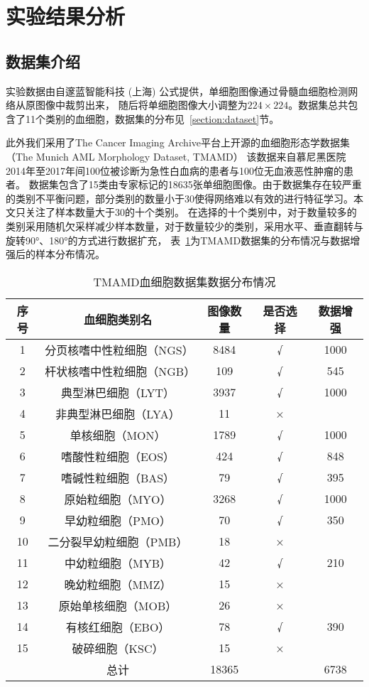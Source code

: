 \section{实验结果分析}
\subsection{数据集介绍}
实验数据由自邃蓝智能科技 (上海) 公式提供，单细胞图像通过骨髓血细胞检测网络从原图像中裁剪出来，
随后将单细胞图像大小调整为$224 \times 224$。数据集总共包含了11个类别的血细胞，数据集的分布见~\ref{section:dataset}节。

此外我们采用了The Cancer Imaging Archive平台上开源的血细胞形态学数据集（The Munich AML Morphology Dataset, TMAMD）
该数据来自慕尼黑医院2014年至2017年间100位被诊断为急性白血病的患者与100位无血液恶性肿瘤的患者。
数据集包含了15类由专家标记的18635张单细胞图像。由于数据集存在较严重的类别不平衡问题，部分类别的数量小于30使得网络难以有效的进行特征学习。本文只关注了样本数量大于30的十个类别。
在选择的十个类别中，对于数量较多的类别采用随机欠采样减少样本数量，对于数量较少的类别，采用水平、垂直翻转与旋转90°、180°的方式进行数据扩充，
表~\ref{table:tmamd_dataset}为TMAMD数据集的分布情况与数据增强\cite{van2001art}后的样本分布情况。

\begin{table}
  \caption{TMAMD血细胞数据集数据分布情况}   
  \centering 
  \label{table:tmamd_dataset}
  \begin{tabular}{ccccc}
    \toprule[2pt]
    序号 & 血细胞类别名  &  图像数量 & 是否选择 & 数据增强 \\
    \midrule[1.5pt] 
        1 & 分页核嗜中性粒细胞（NGS） & 8484 & √ & 1000  \\ 
        2 & 杆状核嗜中性粒细胞（NGB）  & 109 & √ & 545  \\ 
        3 & 典型淋巴细胞（LYT） & 3937 & √ & 1000  \\ 
        4 & 非典型淋巴细胞（LYA） & 11 & × &   \\ 
        5 & 单核细胞（MON） & 1789 & √ & 1000  \\ 
        6 & 嗜酸性粒细胞（EOS）  & 424 & √ & 848  \\ 
        7 & 嗜碱性粒细胞（BAS） & 79 & √ & 395  \\ 
        8 & 原始粒细胞（MYO） & 3268 & √ & 1000  \\ 
        9 & 早幼粒细胞（PMO） & 70 & √ & 350  \\ 
        10 & 二分裂早幼粒细胞（PMB） & 18 & × &   \\ 
        11 & 中幼粒细胞（MYB） & 42 & √ & 210  \\ 
        12 & 晚幼粒细胞（MMZ） & 15 & × &   \\ 
        13 & 原始单核细胞（MOB） & 26 & × &   \\ 
        14 & 有核红细胞（EBO） & 78 & √ & 390  \\ 
        15 & 破碎细胞（KSC） & 15 & × &   \\ 
        ~ & 总计 & 18365 & ~ & 6738  \\ 
    \bottomrule[2pt]      
  \end{tabular} 
\end{table}


